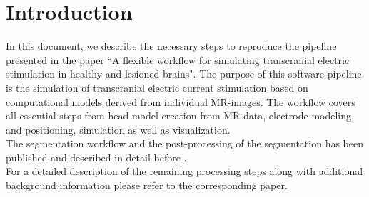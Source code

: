\section{Introduction}
In this document, we describe the necessary steps to reproduce the pipeline presented
in the paper ``A flexible workflow for simulating transcranial electric stimulation in healthy 
and lesioned brains".
The purpose of this software pipeline is the simulation of transcranial electric current stimulation
based on computational models derived from individual MR-images. The workflow covers all essential
steps from head model creation from MR data, electrode modeling, and positioning, simulation
as well as visualization.\\
The segmentation workflow and the post-processing of the segmentation has been published and
described in detail before \cite{kalloch2018semi}.\\
For a detailed description of the remaining processing steps along with additional
background information please refer to the corresponding paper. 
